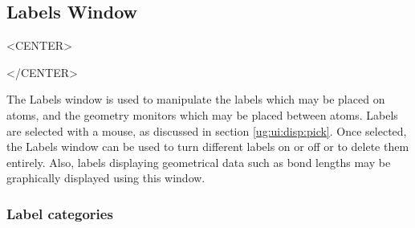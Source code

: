 %
%
%


\subsection{Labels Window}
\label{ug:ui:window:labels}

\begin{rawhtml}
<CENTER>
\end{rawhtml}
\begin{rawhtml}
</CENTER>
\end{rawhtml}

The Labels window is used to manipulate the labels which may be placed on
atoms, and the geometry monitors which may be placed between atoms.
Labels are selected with a mouse, as discussed in section 
\ref{ug:ui:disp:pick}.  Once selected, the {\sf Labels}
window can be used to turn different labels on or off or to delete them
entirely.  Also, labels displaying geometrical data such as bond
lengths may be graphically displayed using this window.


\subsubsection{Label categories}

